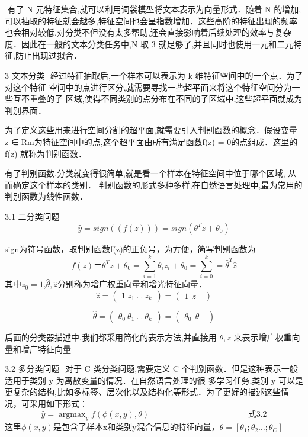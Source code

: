 ​ 有了 N 元特征集合,就可以利用词袋模型将文本表示为向量形式．随着 N 的增加, 可以抽取的特征就会越多,特征空间也会呈指数增加．这些高阶的特征出现的频率也会相对较低,对分类不但没有太多帮助,还会直接影响着后续处理的效率与复杂度．因此在一般的文本分类任务中,N 取 3 就足够了,并且同时也使用一元和二元特征,防止出现过拟合．

3 文本分类
​ 经过特征抽取后,一个样本可以表示为 k 维特征空间中的一个点．为了对这个特征 空间中的点进行区分,就需要寻找一些超平面来将这个特征空间分为一些互不重叠的子 区域,使得不同类别的点分布在不同的子区域中,这些超平面就成为判别界面．

​ 为了定义这些用来进行空间分割的超平面,就需要引入判别函数的概念．假设变量 z ∈ Rm为特征空间中的点,这个超平面由所有满足函数f(z) = 0的点组成．这里的f(z) 就称为判别函数．

​ 有了判别函数,分类就变得很简单,就是看一个样本在特征空间中位于哪个区域, 从而确定这个样本的类别． 判别函数的形式多种多样,在自然语言处理中,最为常用的判别函数为线性函数．

3.1 二分类问题
$$ \hat y =sign((f(z))) = sign(\theta^Tz+\theta_0) $$

sign为符号函数，取判别函数f(z)的正负号，为方便，简写判别函数为 $$ f(z) ＝ \theta^Tz+\theta_0 = \sum_{i=1}^{k}\theta_iz_i + \theta_0 = \sum_{i=0}^{k} = \hat \theta^T \hat z $$ 其中$z_0=1$,$\hat\theta,\hat z$分别称为增广权重向量和增光特征向量． $$ \hat z = \left( \begin{array} {ccc} 1 \ z_1\ .\ .\ z_k \end{array} \right) = \left( \begin{array}{ccc} 1 \ \ z \ \ \
\end{array} \right) $$

$$ \hat \theta = \left( \begin{array} {ccc} \theta_0 \ \theta_1\ .\ .\ \theta_k \end{array} \right) = \left( \begin{array}{ccc} \theta_0 \ \ \theta \ \ \
\end{array} \right) $$

后面的分类器描述中,我们都采用简化的表示方法,并直接用 $θ , z$ 来表示增广权重向量和增广特征向量

3.2 多分类问题
​ 对于 C 类分类问题,需要定义 C 个判别函数．但是这种表示一般适用于类别 y 为离散变量的情况．在自然语言处理的很 多学习任务,类别 y 可以是更复杂的结构,比如多标签、层次化以及结构化等形式．为了更好的描述这些情况，可采用如下形式： $$ \hat y = \mathop{argmax}_yf(\phi(x,y),\theta) \hspace{5cm} 式3.2 $$ 这里$\phi(x,y)$是包含了样本x和类别y混合信息的特征向量，$\theta=[\theta_1;\theta_2…;\theta_C]$

